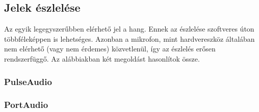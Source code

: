 
\subsection{Jelek \'eszlel\'ese}

Az egyik legegyszer\H ubben el\'erhet\H o jel a hang. Ennek az \'eszlel\'ese szoftveres \'uton t\"obbf\'elek\'eppen is lehets\'eges. Azonban a mikrofon, mint hardvereszk\"oz \'altal\'aban nem el\'erhet\H o (vagy nem \'erdemes) k\"ozvetlen\"ul, \'igy az \'eszlel\'es er\H osen rendszerf\"ugg\H o. Az al\'abbiakban k\'et megold\'ast hasonl\'itok \"ossze.

\subsubsection{PulseAudio}


\subsubsection{PortAudio}